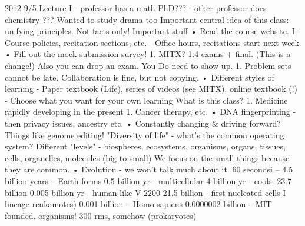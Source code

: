 2012
9/5
Lecture I
- professor has a math PhD???
- other professor does chemistry ??? Wanted to study drama too
Important central idea of this class: unifying
principles.
Not facts
only!
Important stuff
• Read the course website.
I - Course policies, recitation sections, etc.
- Office hours, recitations start next week
• Fill out the mock submission survey!
1. MITX?
1.4 exams + final. (This is a change!) Also you can drop an exam.
You Do need to show up.
1. Problem sets cannot be late. Collaboration is fine, but not copying.
• Different styles of learning
- Paper textbook (Life), series of videos (see MITX), online textbook (!)
- Choose what you want for your own learning
What is this class?
1. Medicine rapidly developing in the present
1. Cancer therapy, etc.
• DNA fingerprinting - then privacy issues, ancestry etc.
• Constantly changing \& driving forward? Things like genome editing!
"Diversity of life" - what's the common operating system?
Different "levels" - biospheres, ecosystems, organisms, organs, tissues, cells,
organelles, molecules (big to small)
We focus on the small things because they are common.
• Evolution - we won't talk much about it. 60 secondsi
– 4.5 billion years – Earth forms
0.5 billion yr - multicellular
4 billion yr - cools.
23.7 billion
0.005 billion yr - human-like
V 2200 21.5 billion - first nucleated cells I
lineage
renkamotes)
0.001 billion – Homo sapiens
0.0000002 billion – MIT founded.
organisms!
300
rms, somehow
(prokaryotes)
